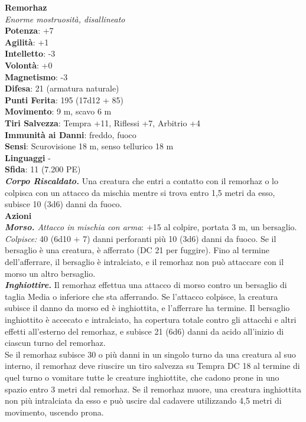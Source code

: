 \begin{multicols}{2}
\medskip\textbf{Remorhaz}\\
\emph{Enorme mostruosità, disallineato}\\
\textbf{Potenza}: +7\\
\textbf{Agilità}: +1\\
\textbf{Intelletto}: -3\\
\textbf{Volontà}: +0\\
\textbf{Magnetismo}: -3\\
\textbf{Difesa}: 21 (armatura naturale)\\
\textbf{Punti Ferita}: 195 (17d12 + 85)\\
\textbf{Movimento}: 9 m, scavo 6 m\\
\textbf{Tiri Salvezza}: Tempra +11, Riflessi +7, Arbitrio +4\\
\textbf{Immunità ai Danni}: freddo, fuoco\\
\textbf{Sensi}: Scurovisione 18 m, senso tellurico 18 m\\
\textbf{Linguaggi} -\\
\textbf{Sfida}: 11 (7.200 PE)\smallskip\\
\emph{\textbf{Corpo Riscaldato.}} Una creatura che entri a contatto con il remorhaz o lo colpisca con un attacco da mischia mentre si trova entro 1,5 metri da esso, subisce 10 (3d6) danni da fuoco.\\
\smallskip\textbf{Azioni}\\
\emph{\textbf{Morso.} Attacco in mischia con arma}: +15 al colpire, portata 3 m, un bersaglio.\\
\emph{Colpisce:} 40 (6d10 + 7) danni perforanti più 10 (3d6) danni da fuoco. Se il bersaglio è una creatura, è afferrato (DC  21 per fuggire). Fino al termine dell'afferrare, il bersaglio è intralciato, e il remorhaz non può attaccare con il morso un altro bersaglio.\\
\emph{\textbf{Inghiottire.}} Il remorhaz effettua una attacco di morso contro un bersaglio di taglia Media o inferiore che sta afferrando. Se l'attacco colpisce, la creatura subisce il danno da morso ed è inghiottita, e l'afferrare ha termine. Il bersaglio inghiottito è accecato e intralciato, ha copertura totale contro gli attacchi e altri effetti all'esterno del remorhaz, e subisce 21 (6d6) danni da acido all'inizio di ciascun turno del remorhaz.\\
Se il remorhaz subisce 30 o più danni in un singolo turno da una creatura al suo interno, il remorhaz deve riuscire un tiro salvezza su Tempra DC  18 al termine di quel turno o vomitare tutte le creature inghiottite, che cadono prone in uno spazio entro 3 metri dal remorhaz. Se il remorhaz muore, una creatura inghiottita non più intralciata da esso e può uscire dal cadavere utilizzando 4,5 metri di movimento, uscendo prona.\\

\end{multicols}
